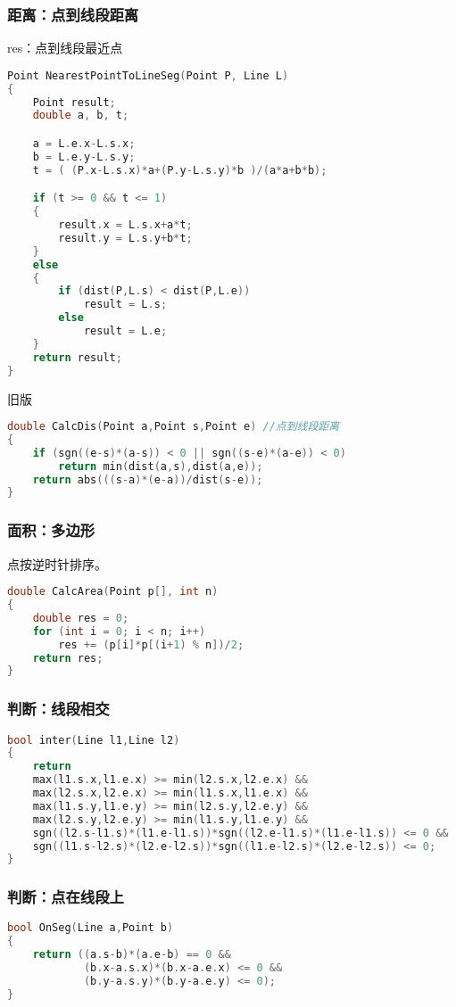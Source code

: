 	\subsubsection{距离：点到线段距离}
		res：点到线段最近点
		\begin{lstlisting}[language=c++]
Point NearestPointToLineSeg(Point P, Line L)
{
	Point result;
	double a, b, t;

	a = L.e.x-L.s.x;
	b = L.e.y-L.s.y;
	t = ( (P.x-L.s.x)*a+(P.y-L.s.y)*b )/(a*a+b*b);

	if (t >= 0 && t <= 1)
	{
		result.x = L.s.x+a*t;
		result.y = L.s.y+b*t;
	}
	else
	{
		if (dist(P,L.s) < dist(P,L.e))
			result = L.s;
		else
			result = L.e;
	}
	return result;
}
		\end{lstlisting}
		旧版
		\begin{lstlisting}[language=c++]
double CalcDis(Point a,Point s,Point e) //点到线段距离
{
	if (sgn((e-s)*(a-s)) < 0 || sgn((s-e)*(a-e)) < 0)
		return min(dist(a,s),dist(a,e));
	return abs(((s-a)*(e-a))/dist(s-e));
}
		\end{lstlisting}
		
	\subsubsection{面积：多边形}
		点按逆时针排序。
		\begin{lstlisting}[language=c++]
double CalcArea(Point p[], int n)
{
	double res = 0;
	for (int i = 0; i < n; i++)
		res += (p[i]*p[(i+1) % n])/2;
	return res;
}
		\end{lstlisting}
	
	\subsubsection{判断：线段相交}
		\begin{lstlisting}[language=c++]
bool inter(Line l1,Line l2)
{
	return 
	max(l1.s.x,l1.e.x) >= min(l2.s.x,l2.e.x) &&
	max(l2.s.x,l2.e.x) >= min(l1.s.x,l1.e.x) &&
	max(l1.s.y,l1.e.y) >= min(l2.s.y,l2.e.y) &&
	max(l2.s.y,l2.e.y) >= min(l1.s.y,l1.e.y) &&
	sgn((l2.s-l1.s)*(l1.e-l1.s))*sgn((l2.e-l1.s)*(l1.e-l1.s)) <= 0 &&
	sgn((l1.s-l2.s)*(l2.e-l2.s))*sgn((l1.e-l2.s)*(l2.e-l2.s)) <= 0;
}
		\end{lstlisting}
	
	\subsubsection{判断：点在线段上}
		\begin{lstlisting}[language=c++]
bool OnSeg(Line a,Point b)
{
	return ((a.s-b)*(a.e-b) == 0 &&
			(b.x-a.s.x)*(b.x-a.e.x) <= 0 &&
			(b.y-a.s.y)*(b.y-a.e.y) <= 0);
}
		\end{lstlisting}
		
